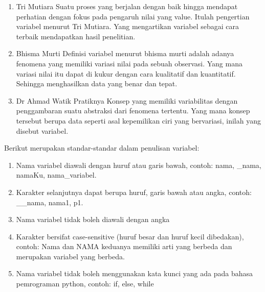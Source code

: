 \begin{enumerate}
    \item Tri Mutiara
Suatu proses yang berjalan dengan baik hingga mendapat perhatian dengan fokus pada pengaruh nilai yang value. Itulah pengertian variabel menurut Tri Mutiara. Yang mengartikan variabel sebagai cara terbaik mendapatkan hasil penelitian.

    \item Bhisma Murti
Definisi variabel menurut bhisma murti adalah adanya fenomena yang memiliki variasi nilai pada sebuah observasi. Yang mana variasi nilai itu dapat di kukur dengan cara kualitatif dan kuantitatif. Sehingga menghasilkan data yang benar dan tepat.

    \item Dr Ahmad Watik Pratiknya
Konsep yang memiliki variabilitas dengan penggambaran suatu abstraksi dari fenomena tertentu. Yang mana konsep tersebut berupa data seperti asal kepemilikan ciri yang bervariasi, inilah yang disebut variabel.
\end{enumerate}
\par
Berikut merupakan standar-standar dalam penulisan variabel:
\begin{enumerate}
\item Nama variabel diawali dengan huruf atau garis bawah, contoh: nama, \_nama, namaKu, nama\_variabel.
\item Karakter selanjutnya dapat berupa huruf, garis bawah atau angka, contoh: \_\_nama, nama1, p1.
\item  Nama variabel tidak boleh diawali dengan angka
\item Karakter bersifat case-sensitive (huruf besar dan huruf kecil dibedakan), contoh: Nama dan NAMA keduanya memiliki arti yang berbeda dan merupakan variabel yang berbeda.
\item Nama variabel tidak boleh menggunakan kata kunci yang ada pada bahasa pemrograman python, contoh: if, else, while
\end{enumerate}

